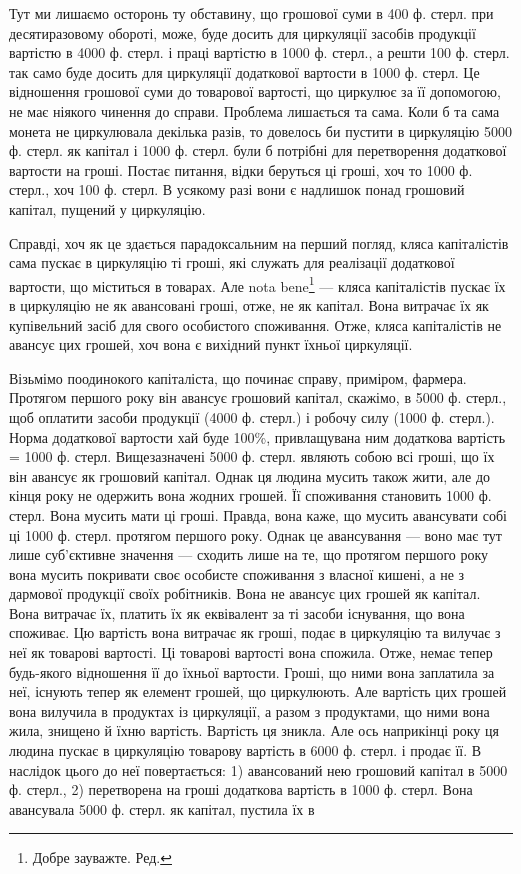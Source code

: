 Тут ми лишаємо осторонь ту обставину, що грошової суми в 400
ф. стерл. при десятиразовому обороті, може, буде досить для циркуляції
засобів продукції вартістю в 4000 ф. стерл. і праці вартістю в 1000 ф.
стерл., а решти 100 ф. стерл. так само буде досить для циркуляції додаткової
вартости в 1000 ф. стерл. Це відношення грошової суми до товарової
вартості, що циркулює за її допомогою, не має ніякого чинення до
справи. Проблема лишається та сама. Коли б та сама монета не циркулювала
декілька разів, то довелось би пустити в циркуляцію 5000 ф. стерл.
як капітал і 1000 ф. стерл. були б потрібні для перетворення додаткової
вартости на гроші. Постає питання, відки беруться ці гроші, хоч то
1000 ф. стерл., хоч 100 ф. стерл. В усякому разі вони є надлишок понад
грошовий капітал, пущений у циркуляцію.

Справді, хоч як це здається парадоксальним на перший погляд, кляса
капіталістів сама пускає в циркуляцію ті гроші, які служать для реалізації
додаткової вартости, що міститься в товарах. Але nota bene\footnote*{
Добре зауважте. Ред.
} — кляса
капіталістів пускає їх в циркуляцію не як авансовані гроші, отже, не як
капітал. Вона витрачає їх як купівельний засіб для свого особистого
споживання. Отже, кляса капіталістів не авансує цих грошей, хоч вона
є вихідний пункт їхньої циркуляції.

Візьмімо поодинокого капіталіста, що починає справу, приміром,
фармера. Протягом першого року він авансує грошовий капітал, скажімо,
в 5000 ф. стерл., щоб оплатити засоби продукції (4000 ф. стерл.) і робочу
силу (1000 ф. стерл.). Норма додаткової вартости хай буде 100\%, привлащувана
ним додаткова вартість = 1000 ф. стерл. Вищезазначені 5000 ф.
стерл. являють собою всі гроші, що їх він авансує як грошовий капітал.
Однак ця людина мусить також жити, але до кінця року не одержить
вона жодних грошей. Її споживання становить 1000 ф. стерл. Вона мусить
мати ці гроші. Правда, вона каже, що мусить авансувати собі ці 1000 ф. стерл.
протягом першого року. Однак це авансування — воно має тут лише
суб’єктивне значення — сходить лише на те, що протягом першого року
вона мусить покривати своє особисте споживання з власної кишені, а не
з дармової продукції своїх робітників. Вона не авансує цих грошей як
капітал. Вона витрачає їх, платить їх як еквівалент за ті засоби існування,
що вона споживає. Цю вартість вона витрачає як гроші, подає в
циркуляцію та вилучає з неї як товарові вартості. Ці товарові вартості
вона спожила. Отже, немає тепер будь-якого відношення її до їхньої
вартости. Гроші, що ними вона заплатила за неї, існують тепер як елемент
грошей, що циркулюють. Але вартість цих грошей вона вилучила
в продуктах із циркуляції, а разом з продуктами, що ними вона жила,
знищено й їхню вартість. Вартість ця зникла. Але ось наприкінці року
ця людина пускає в циркуляцію товарову вартість в 6000 ф. стерл. і продає її.
В наслідок цього до неї повертається: 1) авансований нею грошовий
капітал в 5000 ф. стерл., 2) перетворена на гроші додаткова вартість в
1000 ф. стерл. Вона авансувала 5000 ф. стерл. як капітал, пустила їх в